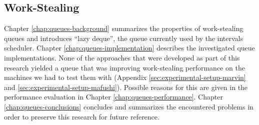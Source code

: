 \subsection{Work-Stealing}

Chapter \ref{chap:queues-background} summarizes the properties of
work-stealing queues and introduces ``lazy deque'', the queue
currently used by the intervals scheduler. Chapter
\ref{chap:queues-implementation} describes the investigated queue
implementations. None of the approaches that were developed as part of
this research yielded a queue that was improving work-stealing
performance on the machines we had to test them with (Appendix
\ref{sec:experimental-setup-marvin} and
\ref{sec:experimental-setup-mafushi}). Possible reasons for this are
given in the performance evaluation in Chapter
\ref{chap:queues-performance}. Chapter \ref{chap:queues-conclusions}
concludes and summarizes the encountered problems in order to preserve
this research for future reference.



